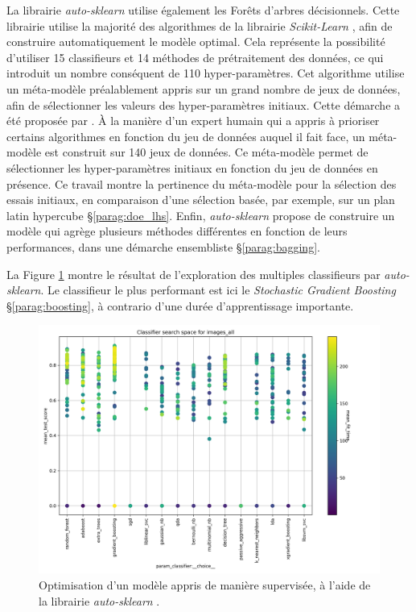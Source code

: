 La librairie \textit{auto-sklearn} \cite{feurer_efficient_2015} utilise également les Forêts d'arbres décisionnels.
Cette librairie utilise la majorité des algorithmes de la librairie \textit{Scikit-Learn} \cite{pedregosa_scikit-learn_2011}, afin de construire automatiquement le modèle optimal.
Cela représente la possibilité d'utiliser 15 classifieurs et 14 méthodes de prétraitement des données, ce qui introduit un nombre conséquent de 110 hyper-paramètres.
Cet algorithme utilise un méta-modèle préalablement appris sur un grand nombre de jeux de données, afin de sélectionner les valeurs des hyper-paramètres initiaux.
Cette démarche a été proposée par \citeauthor{feurer_initializing_2015} \cite{feurer_initializing_2015}.
À la manière d'un expert humain qui a appris à prioriser certains algorithmes en fonction du jeu de données auquel il fait face, un méta-modèle est construit sur 140 jeux de données.
Ce méta-modèle permet de sélectionner les hyper-paramètres initiaux en fonction du jeu de données en présence.
Ce travail montre la pertinence du méta-modèle pour la sélection des essais initiaux, en comparaison d'une sélection basée, par exemple, sur un plan latin hypercube §\ref{parag:doe_lhs}.
Enfin, \textit{auto-sklearn} propose de construire un modèle qui agrège plusieurs méthodes différentes en fonction de leurs performances, dans une démarche ensembliste §\ref{parag:bagging}.

La Figure \ref{fig:autosk_result} montre le résultat de l'exploration des multiples classifieurs par \textit{auto-sklearn}.
Le classifieur le plus performant est ici le \textit{Stochastic Gradient Boosting} §\ref{parag:boosting}, à contrario d'une durée d'apprentissage importante.

\begin{figure}[hbtp]
	\centering
	\includegraphics[width=\textwidth,height=\textheight,keepaspectratio]{../Chap4/Figures/cv_results_images_all.png}
	\caption{Optimisation d'un modèle appris de manière supervisée, à l'aide de la librairie \textit{auto-sklearn} \cite{feurer_efficient_2015}.}
	\label{fig:autosk_result}
\end{figure}


